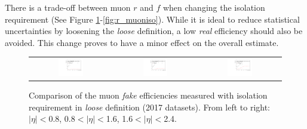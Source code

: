 There is a trade-off between muon $r$ and $f$ when changing the isolation requirement (See Figure \ref{fig:f_muoniso}-\ref{fig:r_muoniso}). While it is ideal to reduce statistical uncertainties by loosening the \emph{loose} definition, a low \emph{real} efficiency should also be avoided. This change proves to have a minor effect on the overall estimate.
 
\begin{figure}[tbh!]
 \begin{center}
 \begin{tabular}{ccc}
 \includegraphics[width=0.32\textwidth]{figures/Part3/Nonprompt/MR/f_muoniso_barrel}&
 \includegraphics[width=0.32\textwidth]{figures/Part3/Nonprompt/MR/f_muoniso_transition}&
 \includegraphics[width=0.32\textwidth]{figures/Part3/Nonprompt/MR/f_muoniso_endcap} \\
 \end{tabular}
 \caption{Comparison of the muon \emph{fake} efficiencies measured with isolation requirement in \emph{loose} definition (2017 datasets). From left to right: $|\eta|<$0.8, 0.8$<|\eta|<$1.6, 1.6$<|\eta|<$2.4.}
 \label{fig:f_muoniso}
 \end{center}
\end{figure}

